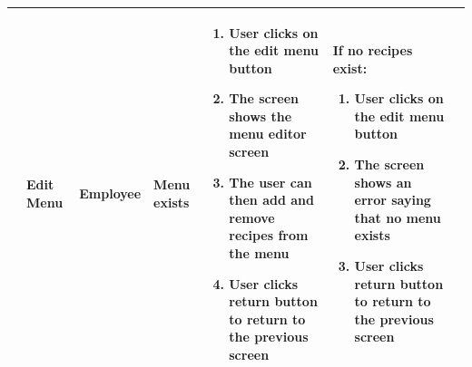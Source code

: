 \begin{landscape}
\begin{longtable}{|p{}|p{}|p{}|p{}|p{}|p{}|p{}|}
	 \rownumber & Edit Menu & Employee & Menu exists & 
	\begin{enumerate}[wide, labelwidth=!, labelindent=0pt, nosep, topsep=0pt, parsep=0pt]
		\item User clicks on the edit menu button
		\item The screen shows the menu editor screen
		\item The user can then add and remove recipes from the menu
		\item User clicks return button to return to the previous screen
	\end{enumerate} & If no recipes exist:\begin{enumerate}[wide, labelwidth=!, labelindent=0pt, nosep, topsep=0pt, parsep=0pt]
		\item User clicks on the edit menu button
		\item The screen shows an error saying that no menu exists
		\item User clicks return button to return to the previous screen
	\end{enumerate} & \\\hline

\end{longtable}
\end{landscape}
\restoregeometry

